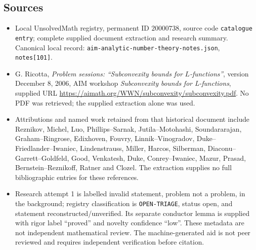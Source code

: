 \documentclass[11pt]{article}
\begin{document}
\subsection{Sources}
\begin{itemize}
\item Local UnsolvedMath registry, permanent ID $20000738$, source code \texttt{catalogue entry}; complete supplied document extraction and research summary. Canonical local record: \texttt{aim-analytic-number-theory-notes.json}, \texttt{notes[101]}.
\item G. Ricotta, \emph{Problem sessions: ``Subconvexity bounds for $L$-functions''}, version December 8, 2006, AIM workshop \emph{Subconvexity bounds for L-functions}, supplied URL \url{https://aimath.org/WWN/subconvexity/subconvexity.pdf}. No PDF was retrieved; the supplied extraction alone was used.
\item Attributions and named work retained from that historical document include Reznikov, Michel, Luo, Phillips--Sarnak, Jutila--Motohashi, Soundararajan, Graham--Ringrose, Edixhoven, Fouvry, Linnik--Vinogradov, Duke--Friedlander--Iwaniec, Lindenstrauss, Miller, Harcos, Silberman, Diaconu--Garrett--Goldfeld, Good, Venkatesh, Duke, Conrey--Iwaniec, Mazur, Prasad, Bernstein--Reznikoff, Ratner and Clozel. The extraction supplies no full bibliographic entries for these references.
\item Research attempt 1 is labelled invalid statement, problem not a problem, in the background; registry classification is \texttt{OPEN-TRIAGE}, status open, and statement reconstructed/unverified. Its separate conductor lemma is supplied with rigor label ``proved'' and novelty confidence ``low''. These metadata are not independent mathematical review. The machine-generated aid is not peer reviewed and requires independent verification before citation.
\end{itemize}
\end{document}
